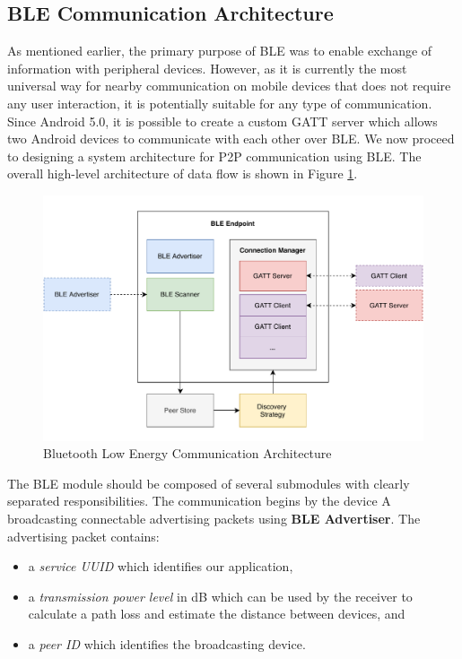 \subsection{BLE Communication Architecture}

As mentioned earlier, the primary purpose of BLE was to enable exchange of information with peripheral devices. However, as it is currently the most universal way for nearby communication on mobile devices that does not require any user interaction, it is potentially suitable for any type of communication. Since Android 5.0, it is possible to create a custom GATT server which allows two Android devices to communicate with each other over BLE. We now proceed to designing a system architecture for P2P communication using BLE. The overall high-level architecture of data flow is shown in Figure \ref{ble_architecture}.

\begin{figure}
    \includegraphics[width=\textwidth]{diagrams/ipv8-ble-architecture}
    \caption{Bluetooth Low Energy Communication Architecture}
    \label{ble_architecture}
\end{figure}

The BLE module should be composed of several submodules with clearly separated responsibilities. The communication begins by the device A broadcasting connectable advertising packets using \textbf{BLE Advertiser}. The advertising packet contains:

\begin{itemize}
    \item a \textit{service UUID} which identifies our application,
    \item a \textit{transmission power level} in dB which can be used by the receiver to calculate a path loss and estimate the distance between devices, and
    \item a \textit{peer ID} which identifies the broadcasting device.
\end{itemize}

